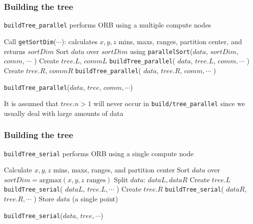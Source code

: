 \documentclass[usernames,dvipsnames]{beamer}
\begin{document}
\begin{frame}
	\frametitle{Building the tree}
	
	\texttt{buildTree\_parallel} performs ORB using a multiple compute nodes
	
	\vspace{10pt}
	
	\begin{algorithm}[H]
		\footnotesize
		\begin{algorithmic}[1]
			\STATE Call \texttt{getSortDim}($\cdots$): calculates $x,y,z$ mins, maxs, ranges, partition center, and returns $sortDim$
			\STATE Sort $data$ over $sortDim$ using \texttt{parallelSort}($data$, $sortDim$, $comm$, $\cdots$ )
				\STATE Create $tree.L$, $commL$
				\STATE \texttt{buildTree\_parallel}( $data$, $tree.L$, $comm, \cdots$ )
			\ELSE
				\STATE Create $tree.R$, $commR$
				\STATE \texttt{buildTree\_parallel}( $data$, $tree.R$, $comm, \cdots$ )
			\ENDIF
		\end{algorithmic}
		\caption{\texttt{buildTree\_parallel}($data$, $tree$, $comm, \cdots$)}
	\end{algorithm}
	
	\vspace{10pt}
	
	It is assumed that $tree.n > 1$ will never occur in \texttt{build/tree\_parallel} since we usually deal with large amounts of data
		
\end{frame}

\begin{frame}
	\frametitle{Building the tree}
	
	\texttt{buildTree\_serial} performs ORB using a single compute node
	
	\vspace{10pt}
	
	\begin{algorithm}[H]
		\footnotesize
		\begin{algorithmic}[1]
				\STATE Calculate $x,y,z$ mins, maxs, ranges, and partition center
				\STATE Sort $data$ over $sortDim = \textrm{argmax}( x,y,z \textrm{ ranges})$
				\STATE Split $data$: $dataL, dataR$
					\STATE Create $tree.L$
					\STATE \texttt{buildTree\_serial}( $dataL$, $tree.L, \cdots$ )
				\ENDIF
					\STATE Create $tree.R$
					\STATE \texttt{buildTree\_serial}( $dataR$, $tree.R, \cdots$ )
				\ENDIF
			\ELSE
				\STATE Store $data$ (a single point)
			\ENDIF
		\end{algorithmic}
	\caption{\texttt{buildTree\_serial}($data$, $tree, \cdots$)}
	\end{algorithm}
		
\end{frame}
\end{document}
